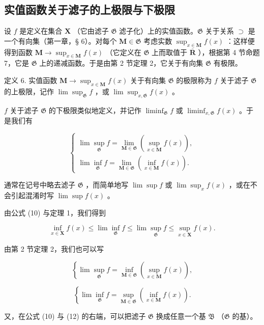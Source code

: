 \subsection{实值函数关于滤子的上极限与下极限}

设 \(f\) 是定义在集合 \(\mathbf{X}\) （它由滤子 \(\mathfrak{G}\) 滤子化）上的实值函数。\(\mathfrak{G}\) 关于关系 \(\supset\) 是一个有向集（第一章，§ 6）。对每个 \(\mathbf{M} \in \mathfrak{G}\) 考虑实数 \(\sup_{x \in \mathbf{M}} f(x)\) ：这样便得到函数 \(\mathbf{M} \to \sup_{x \in \mathbf{M}} f(x)\) （它定义在 \(\mathfrak{G}\) 上而取值于 \(\overline{\mathbf{R}}\) ），根据第 4 节命题 7，它是 \(\mathfrak{G}\) 上的递减函数。于是由第 2 节定理 2，它关于有向集 \(\mathfrak{G}\) 有极限。

定义 6. 实值函数 \(\mathbf{M} \to \sup_{x \in \mathbf{M}} f(x)\) 关于有向集 \(\mathfrak{G}\) 的极限称为 \(f\) 关于滤子 \(\mathfrak{G}\) 的上极限，记作 \(\lim \sup_{\mathfrak{G}} f\) ，或 \(\lim \sup_{x, \mathfrak{G}} f(x)\) 。

\(f\) 关于滤子 \(\mathfrak{G}\) 的下极限类似地定义，并记作 \(\liminf_{\mathfrak{G}} f\) 或 \(\liminf_{x, \mathfrak{G}} f(x)\) 。于是我们有

\[
\left\{ \begin{array}{l} \lim \sup_{\mathfrak{G}} f = \lim_{\mathbf {M} \in \mathfrak {G}}(\sup_{x \in \mathbf {M}}f(x)), \\ \lim \inf_{\mathfrak{G}} f = \lim_{\mathbf {M} \in \mathfrak {G}}(\inf_{x \in \mathbf {M}}f(x)). \end{array} \right.\tag{10}
\]

通常在记号中略去滤子 \(\mathfrak{G}\) ，而简单地写 \(\lim \sup f\) 或 \(\lim \sup_x f(x)\) ，或在不会引起混淆时写 \(\lim \sup f(x)\) 。

由公式 (10) 与定理 1，我们得到

\[
\inf _ {x \in \mathbf {X}} f (x) \leqslant \lim \inf _ {\mathfrak {G}} f \leqslant \lim \sup _ {\mathfrak {G}} f \leqslant \sup _ {x \in \mathbf {X}} f (x).\tag{11}
\]

由第 2 节定理 2，我们也可以写

\[
\left\{\lim \sup _ {\mathfrak {G}} f = \inf _ {\mathbf {M} \in \mathfrak {G}} (\sup _ {x \in \mathbf {M}} f (x)), \right.\tag{12}
\]

\[
\left\{\lim \inf _ {\mathfrak {G}} f = \sup _ {\mathbf {M} \in \mathfrak {G}} (\inf _ {x \in \mathbf {M}} f (x)). \right.
\]

又，在公式 (10) 与 (12) 的右端，可以把滤子 \(\mathfrak{G}\) 换成任意一个基 \(\mathfrak{B}\) （\(\mathfrak{G}\) 的基）。

